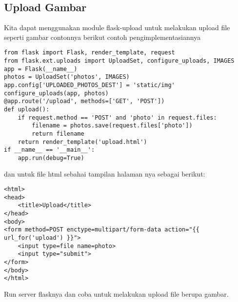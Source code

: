\documentclass[12pt,a4paper]{article}
\begin{document}
\subsection{Upload Gambar}
Kita dapat menggunakan module flask-upload untuk melakukan upload file seperti gambar contonnya berikut contoh pengimplementasiannya
\begin{verbatim}
from flask import Flask, render_template, request
from flask.ext.uploads import UploadSet, configure_uploads, IMAGES
app = Flask(__name__)
photos = UploadSet('photos', IMAGES)
app.config['UPLOADED_PHOTOS_DEST'] = 'static/img'
configure_uploads(app, photos)
@app.route('/upload', methods=['GET', 'POST'])
def upload():
    if request.method == 'POST' and 'photo' in request.files:
        filename = photos.save(request.files['photo'])
        return filename
    return render_template('upload.html')
if __name__ == '__main__':
    app.run(debug=True)
\end{verbatim}
dan untuk file html sebahai tampilan halaman nya sebagai berikut:
\begin{verbatim}
<html>
<head>
    <title>Upload</title>
</head>
<body>
<form method=POST enctype=multipart/form-data action="{{ url_for('upload') }}">
    <input type=file name=photo>
    <input type="submit">
</form>
</body>
</html>
\end{verbatim}
Run server flasknya dan coba untuk melakukan upload file berupa gambar.
\end{document}
